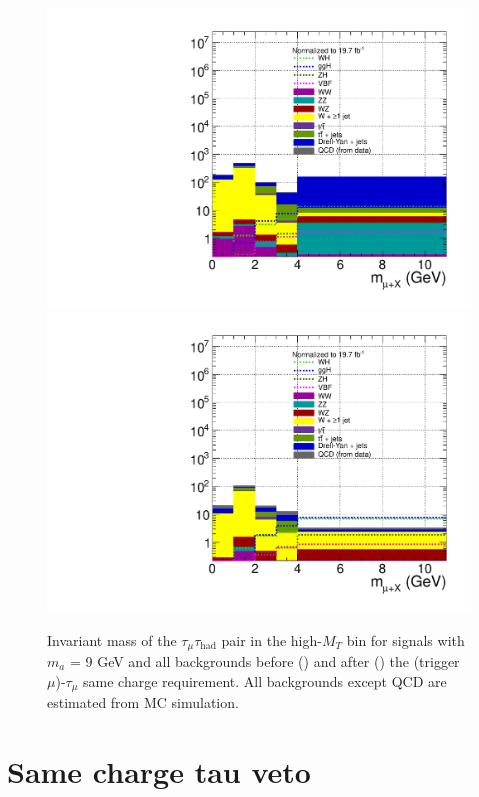 \begin{figure}[hbtp]
  \begin{center}
    \includegraphics[width=1.2\cmsFigWidth]{figures/muHadMass_highMT_beforeOSSF}
    \includegraphics[width=1.2\cmsFigWidth]{figures/muHadMass_highMT_afterOSSF}
    \caption{Invariant mass of the $\tau_{\mu}\tau_{\text{had}}$ pair in the high-$M_{T}$ bin for signals with $m_a$ = 9 GeV and all backgrounds before (\cmsLeft) and after (\cmsRight) the (trigger $\mu$)-$\tau_{\mu}$ same charge requirement.  All backgrounds except QCD are estimated from MC simulation. }
    \label{fig:muHadMass_OSSFVeto_vs_none_highMT}
  \end{center}
\end{figure}

\section{Same charge tau veto\label{sec:evtsel-SSSF}}


